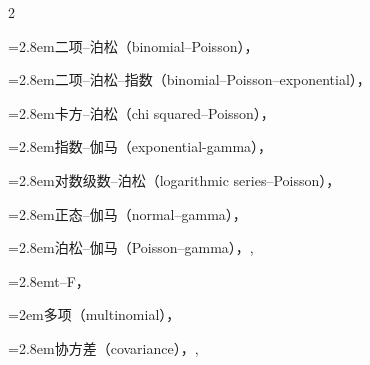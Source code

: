 \begin{multicols}{2}
\par\noindent\hangindent=2.8em\hspace*{1.8em}\label{idx:340}二项–泊松（binomial–Poisson），\hyperref[ex:4.4.1]{\pageref*{ex:4.4.1}}\par
\par\noindent\hangindent=2.8em\hspace*{1.8em}\label{idx:341}二项–泊松–指数（binomial–Poisson–exponential），\hyperref[ex:4.4.5]{\pageref*{ex:4.4.5}}\par
\par\noindent\hangindent=2.8em\hspace*{1.8em}\label{idx:342}卡方–泊松（chi squared–Poisson），\hyperref[eq:4.4.3]{\pageref*{eq:4.4.3}}\par
\par\noindent\hangindent=2.8em\hspace*{1.8em}\label{idx:343}指数–伽马（exponential-gamma），\hyperref[exercise:4.38]{\pageref*{exercise:4.38}}\par
\par\noindent\hangindent=2.8em\hspace*{1.8em}\label{idx:344}对数级数–泊松（logarithmic series–Poisson），\hyperref[exercise:4.33]{\pageref*{exercise:4.33}}\par
\par\noindent\hangindent=2.8em\hspace*{1.8em}\label{idx:345}正态–伽马（normal–gamma），\hyperref[exercise:5.20]{\pageref*{exercise:5.20}}\par
\par\noindent\hangindent=2.8em\hspace*{1.8em}\label{idx:346}泊松–伽马（Poisson–gamma），\hyperref[idxocc:346:167]{\pageref*{idxocc:346:167}}, \hyperref[exercise:4.32]{\pageref*{exercise:4.32}}\par
\par\noindent\hangindent=2.8em\hspace*{1.8em}\label{idx:347}t–F，\hyperref[exercise:5.20]{\pageref*{exercise:5.20}}\par
\par\noindent\hangindent=2em\hspace*{1em}\label{idx:348}多项（multinomial），\hyperref[def:4.6.2]{\pageref*{def:4.6.2}}\par
\par\noindent\hangindent=2.8em\hspace*{1.8em}\label{idx:349}协方差（covariance），\hyperref[idxocc:349:180]{\pageref*{idxocc:349:180}}, \hyperref[exercise:4.39]{\pageref*{exercise:4.39}}\par

\end{multicols}
